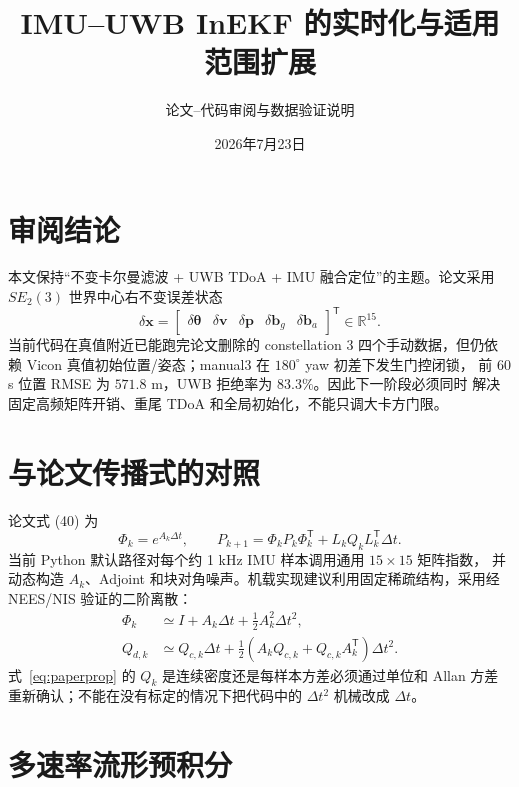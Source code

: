 \documentclass[11pt,a4paper]{ctexart}
\title{IMU--UWB InEKF 的实时化与适用范围扩展}
\author{论文--代码审阅与数据验证说明}
\date{2026年7月23日}
\begin{document}
\maketitle

\section{审阅结论}

本文保持“不变卡尔曼滤波 + UWB TDoA + IMU 融合定位”的主题。论文采用
$SE_2(3)$ 世界中心右不变误差状态
\begin{equation}
\delta\bm x=
\begin{bmatrix}
\delta\bm\theta&
\delta\bm v&
\delta\bm p&
\delta\bm b_g&
\delta\bm b_a
\end{bmatrix}^{\mathsf T}\in\mathbb R^{15}.
\end{equation}
当前代码在真值附近已能跑完论文删除的 constellation 3 四个手动数据，但仍依赖
Vicon 真值初始位置/姿态；manual3 在 $180^\circ$ yaw 初差下发生门控闭锁，
前 60 s 位置 RMSE 为 $571.8$ m，UWB 拒绝率为 $83.3\%$。因此下一阶段必须同时
解决固定高频矩阵开销、重尾 TDoA 和全局初始化，不能只调大卡方门限。

\section{与论文传播式的对照}

论文式 (40) 为
\begin{equation}
\Phi_k=e^{A_k\Delta t},\qquad
P_{k+1}=\Phi_kP_k\Phi_k^{\mathsf T}
+L_kQ_kL_k^{\mathsf T}\Delta t.
\label{eq:paperprop}
\end{equation}
当前 Python 默认路径对每个约 1 kHz IMU 样本调用通用 $15\times15$ 矩阵指数，
并动态构造 $A_k$、Adjoint 和块对角噪声。机载实现建议利用固定稀疏结构，采用经
NEES/NIS 验证的二阶离散：
\begin{align}
\Phi_k&\simeq I+A_k\Delta t+\frac12A_k^2\Delta t^2,
\label{eq:phi2}\\
Q_{d,k}&\simeq Q_{c,k}\Delta t+
\frac12\left(A_kQ_{c,k}+Q_{c,k}A_k^{\mathsf T}\right)\Delta t^2.
\label{eq:qd2}
\end{align}
式~\eqref{eq:paperprop} 的 $Q_k$ 是连续密度还是每样本方差必须通过单位和 Allan
方差重新确认；不能在没有标定的情况下把代码中的 $\Delta t^2$ 机械改成 $\Delta t$。

\section{多速率流形预积分}
\end{document}
